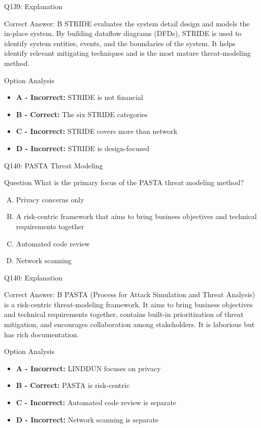 \documentclass{beamer}
\begin{document}
	\begin{frame}{Q139: Explanation}
		\begin{block}{Correct Answer: B}
			STRIDE evaluates the system detail design and models the in-place system. By building dataflow diagrams (DFDs), STRIDE is used to identify system entities, events, and the boundaries of the system. It helps identify relevant mitigating techniques and is the most mature threat-modeling method.
		\end{block}
		\begin{block}{Option Analysis}
			\begin{itemize}
				\item \textbf{A - Incorrect:} STRIDE is not financial
				\item \textbf{B - Correct:} The six STRIDE categories
				\item \textbf{C - Incorrect:} STRIDE covers more than network
				\item \textbf{D - Incorrect:} STRIDE is design-focused
			\end{itemize}
		\end{block}
	\end{frame}
	
	\begin{frame}{Q140: PASTA Threat Modeling}
		\begin{block}{Question}
			What is the primary focus of the PASTA threat modeling method?
		\end{block}
		\begin{enumerate}[(A)]
			\item Privacy concerns only
			\item A risk-centric framework that aims to bring business objectives and technical requirements together
			\item Automated code review
			\item Network scanning
		\end{enumerate}
	\end{frame}
	
	\begin{frame}{Q140: Explanation}
		\begin{block}{Correct Answer: B}
			PASTA (Process for Attack Simulation and Threat Analysis) is a risk-centric threat-modeling framework. It aims to bring business objectives and technical requirements together, contains built-in prioritization of threat mitigation, and encourages collaboration among stakeholders. It is laborious but has rich documentation.
		\end{block}
		\begin{block}{Option Analysis}
			\begin{itemize}
				\item \textbf{A - Incorrect:} LINDDUN focuses on privacy
				\item \textbf{B - Correct:} PASTA is risk-centric
				\item \textbf{C - Incorrect:} Automated code review is separate
				\item \textbf{D - Incorrect:} Network scanning is separate
			\end{itemize}
		\end{block}
	\end{frame}
	
\end{document}
